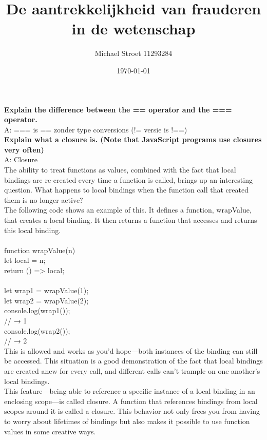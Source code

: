 \documentclass[10pt,a4paper]{article}
\author{Michael Stroet 11293284}
\title{De aantrekkelijkheid van frauderen in de wetenschap}
\date{\today}
\begin{document}
\noindent
\textbf{Explain the difference between the == operator and the === operator.}\\

A: === is == zonder type conversions (!= versie is !==)\\

\noindent
\textbf{Explain what a closure is. (Note that JavaScript programs use closures very often)}\\

A: Closure\\
The ability to treat functions as values, combined with the fact that local bindings are re-created every time a function is called, brings up an interesting question. What happens to local bindings when the function call that created them is no longer active?\\

The following code shows an example of this. It defines a function, wrapValue, that creates a local binding. It then returns a function that accesses and returns this local binding.\\
\\
\noindent
function wrapValue(n) {\\
  let local = n;\\
  return () => local;\\
}\\
\noindent
let wrap1 = wrapValue(1);\\
let wrap2 = wrapValue(2);\\
console.log(wrap1());\\
// → 1\\
console.log(wrap2());\\
// → 2\\

This is allowed and works as you’d hope—both instances of the binding can still be accessed. This situation is a good demonstration of the fact that local bindings are created anew for every call, and different calls can’t trample on one another’s local bindings.\\

This feature—being able to reference a specific instance of a local binding in an enclosing scope—is called closure. A function that references bindings from local scopes around it is called a closure. This behavior not only frees you from having to worry about lifetimes of bindings but also makes it possible to use function values in some creative ways.\\
\end{document}
